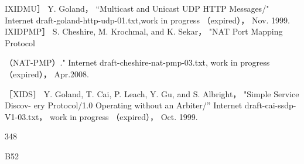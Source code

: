 IXIDMU］ Y. Goland， “Multicast and Unicast UDP HTTP Messages/" Internet
draft-goland-http-udp-01.txt,work in progress （expired）， Nov. 1999.
IXIDPMP］ S. Cheshire, M. Krochmal, and K. Sekar， "NAT Port Mapping Protocol

（NAT-PMP）." Internet draft-cheshire-nat-pmp-03.txt, work in progress （expired），
Apr.2008.

［XIDS］ Y. Goland, T. Cai, P. Leach, Y. Gu, and S. Albright， "Simple Service Discov-
ery Protocol/1.0 Operating without an Arbiter/” Internet draft-cai-ssdp-V1-03.txt，
work in progress （expired）， Oct. 1999.

348

B52